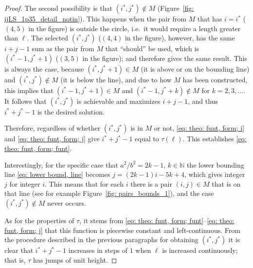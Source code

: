 \documentclass[12pt, a4paper]{article}
\newcommand{\funt}{\tau} %
\newcommand{\len}{\ell} %
\newcommand{\isoli}{i^\ast}
\newcommand{\jsoli}{j^\ast}
\newcommand{\mss}{M}
\begin{document}
\begin{proof}
The second possibility is that $(\isoli,\jsoli) \notin \mss$ (Figure~\ref{fig: ijLS_1p35_detail_notin}). This happens when the pair from $\mss$ that has $i = \isoli$ ($(4,5)$ in the figure) is outside the circle, i.e.~it would require a length greater than $\len$. The selected $(\isoli,\jsoli)$ ($(4,4)$ in the figure), however, has the same $i+j-1$ sum as the pair from $\mss$ that ``should'' be used, which is $(\isoli-1,\jsoli+1)$ ($(3,5)$ in the figure); and therefore gives the same result. This is always the case, because  $(\isoli,\jsoli+1) \in \mss$ (it is above or on the bounding line) and $(\isoli,\jsoli) \notin \mss$ (it is below the line), and due to how $\mss$ has been constructed, this implies that $(\isoli-1,\jsoli+1) \in \mss$ and $(\isoli-1,\jsoli+k) \notin \mss$ for $k =2, 3, \ldots$. It follows that $(\isoli,\jsoli)$ is achievable and maximizes $i+j-1$, and thus $\isoli+\jsoli-1$ is the desired solution.

Therefore, regardless of whether $(\isoli,\jsoli)$ is in $\mss$ or not, \eqref{eq: theo: funt, form; i} and \eqref{eq: theo: funt, form; j} give $\isoli+\jsoli-1$ equal to $\funt(\len)$. This establishes \eqref{eq: theo: funt, form; funt}.

Interestingly, for the specific case that $a^2/b^2 = 2k-1$, $k \in \mathbb N$ the lower bounding line \eqref{eq: lower bound, line} becomes $j = (2k-1)i - 5k + 4$, which gives integer $j$ for integer $i$. This means that for each $i$ there is a pair $(i,j) \in \mss$ that is on that line (see for example Figure~\ref{fig: pairs_bounds_1}), and the case $(\isoli,\jsoli) \notin \mss$ never occurs.

As for the properties of $\funt$, it stems from \eqref{eq: theo: funt, form; funt}--\eqref{eq: theo: funt, form; j} that this function is piecewise constant and left-continuous. From the procedure described in the previous paragraphs for obtaining $(\isoli, \jsoli)$ it is clear that $\isoli+\jsoli-1$ increases in steps of $1$ when $\len$ is increased continuously; that is, $\funt$ has jumps of unit height.


\end{proof}
\end{document}
